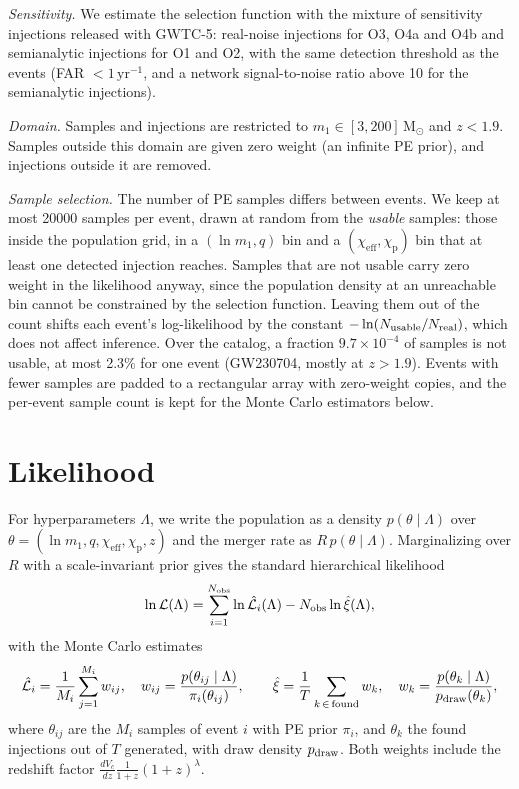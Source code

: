 \documentclass[%
 onecolumn,
 amsmath,amssymb,
 aps,
 prl,
 nofootinbib,nobibnotes,
]{revtex4-2}
\newcommand{\Msun}{\ensuremath{\mathrm{M}_{\odot}}}
\newcommand{\chieff}{\ensuremath{\chi_{\mathrm{eff}}}}
\newcommand{\chip}{\ensuremath{\chi_{\mathrm{p}}}}
\newcommand{\peryear}{\ensuremath{\,\mathrm{yr}^{-1}}}
\begin{document}
\textit{Sensitivity.} We estimate the selection function with the mixture of sensitivity injections released with \ac{GWTC-5}: real-noise injections for O3, O4a and O4b and semianalytic injections for O1 and O2, with the same detection threshold as the events (\ac{FAR} $< 1\peryear$, and a network signal-to-noise ratio above 10 for the semianalytic injections).

\textit{Domain.} Samples and injections are restricted to $m_1 \in [3, 200]\,\Msun$ and $z < 1.9$. Samples outside this domain are given zero weight (an infinite \ac{PE} prior), and injections outside it are removed.

\textit{Sample selection.} The number of \ac{PE} samples differs between events. We keep at most 20000 samples per event, drawn at random from the \emph{usable} samples: those inside the population grid, in a $(\ln m_1, q)$ bin and a $(\chieff, \chip)$ bin that at least one detected injection reaches. Samples that are not usable carry zero weight in the likelihood anyway, since the population density at an unreachable bin cannot be constrained by the selection function. Leaving them out of the count shifts each event's log-likelihood by the constant $-\ln(N_{\rm usable}/N_{\rm real})$, which does not affect inference. Over the catalog, a fraction $9.7 \times 10^{-4}$ of samples is not usable, at most 2.3\% for one event (GW230704, mostly at $z > 1.9$). Events with fewer samples are padded to a rectangular array with zero-weight copies, and the per-event sample count is kept for the Monte Carlo estimators below.

\section{Likelihood}
\label{sm: likelihood}

For hyperparameters $\Lambda$, we write the population as a density $p(\theta \mid \Lambda)$ over $\theta = (\ln m_1, q, \chieff, \chip, z)$ and the merger rate as $R\, p(\theta \mid \Lambda)$. Marginalizing over $R$ with a scale-invariant prior gives the standard hierarchical likelihood~\cite{Mandel:2018mve, Thrane:2018qnx}
\begin{equation}
    \ln \mathcal{L}(\Lambda) = \sum_{i=1}^{N_{\rm obs}} \ln \hat{\mathcal{L}}_i(\Lambda) - N_{\rm obs} \ln \hat{\xi}(\Lambda),
\end{equation}
with the Monte Carlo estimates
\begin{equation}
    \hat{\mathcal{L}}_i = \frac{1}{M_i} \sum_{j=1}^{M_i} w_{ij}, \quad w_{ij} = \frac{p(\theta_{ij} \mid \Lambda)}{\pi_i(\theta_{ij})}, \qquad
    \hat{\xi} = \frac{1}{T} \sum_{k\,\in\,\rm found} w_k, \quad w_k = \frac{p(\theta_k \mid \Lambda)}{p_{\rm draw}(\theta_k)},
\end{equation}
where $\theta_{ij}$ are the $M_i$ samples of event $i$ with \ac{PE} prior $\pi_i$, and $\theta_k$ the found injections out of $T$ generated, with draw density $p_{\rm draw}$. Both weights include the redshift factor $\frac{dV_c}{dz} \frac{1}{1+z} (1 + z)^{\lambda}$.
\end{document}
